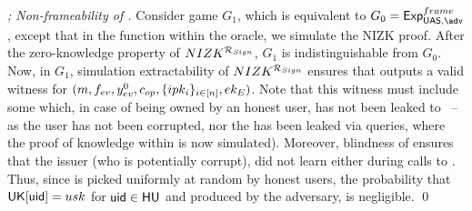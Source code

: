 \begin{proof}[; Non-frameability of \CUASGen]
  Consider game $G_1$, which is equivalent to $G_0 = \ExpNonframe$, except that
  in the \Sign function within the \SIGN oracle, we simulate the NIZK proof.
  After the zero-knowledge property of $NIZK^{\mathcal{R}_{Sign}}$, $G_1$ is
  indistinguishable from $G_0$. Now, in $G_1$, simulation extractability of
  $NIZK^{\mathcal{R}_{Sign}}$ ensures that \ExtractSign outputs a valid
  witness for $(m,f_{ev},y_{ev}^0,c_{op},\lbrace ipk_i \rbrace_{i\in[n]},
  ek_{E})$. Note that this witness must include some \usk which, in case of
  being owned by an honest user, has not been leaked to \adv~--as the user
  has not been corrupted, nor the \usk has been leaked via \SIGN queries,
  where the proof of knowledge within \Sign is now simulated). Moreover,
  blindness of \SBCM ensures that the issuer (who is potentially corrupt), did
  not learn \usk either during calls to \OBTAIN. Thus, since \usk is picked
  uniformly at random by honest users, the probability that $\mathsf{UK}[\mathsf{uid}] = usk$
  for $\mathsf{uid} \in \mathsf{HU}$ and \Sig produced by the adversary, is negligible.
  \qed
\end{proof}


